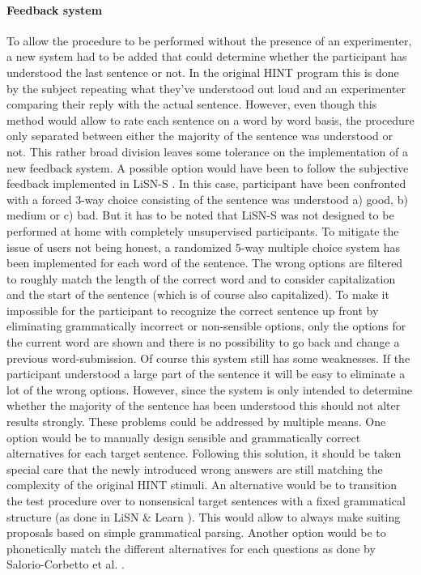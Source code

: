 \documentclass[a4paper,11pt]{article}%
\renewcommand{\\}{\vspace*{0.5\baselineskip} \newline}
\begin{document}
{{\paragraph{Feedback system} To allow the procedure to be performed without the presence of an experimenter, a new system had to be added that could determine whether the participant has understood the last sentence or not. In the original \ac{HINT} program this is done by the subject repeating what they've understood out loud and an experimenter comparing their reply with the actual sentence. However, even though this method would allow to rate each sentence on a word by word basis, the procedure only separated between either the majority of the sentence was understood or not. This rather broad division leaves some tolerance on the implementation of a new feedback system. A possible option would have been to follow the subjective feedback implemented in \ac{LiSN-S} \cite{Cameron2007}. In this case, participant have been confronted with a forced 3-way choice consisting of the sentence was understood a) good, b) medium or c) bad. But it has to be noted that \ac{LiSN-S} was not designed to be performed at home with completely unsupervised participants. To mitigate the issue of users not being honest, a randomized 5-way multiple choice system has been implemented for each word of the sentence. The wrong options are filtered to roughly match the length of the correct word and to consider capitalization and the start of the sentence (which is of course also capitalized). To make it impossible for the participant to recognize the correct sentence up front by eliminating grammatically incorrect or non-sensible options, only the options for the current word are shown and there is no possibility to go back and change a previous word-submission. Of course this system still has some weaknesses. If the participant understood a large part of the sentence it will be easy to eliminate a lot of the wrong options. However, since the system is only intended to determine whether the majority of the sentence has been understood this should not alter results strongly.
\newline
\newline
These problems could be addressed by multiple means. One option would be to manually design sensible and grammatically correct alternatives for each target sentence. Following this solution, it should be taken special care that the newly introduced wrong answers are still matching the complexity of the original \ac{HINT} stimuli. An alternative would be to transition the test procedure over to nonsensical target sentences with a fixed grammatical structure (as done in \ac{LiSN} \& Learn \cite{Cameron2011}). This would allow to always make suiting proposals based on simple grammatical parsing. Another option would be to phonetically match the different alternatives for each questions as done by Salorio-Corbetto et al. \cite{salorioevaluating}.
}}
\end{document}
